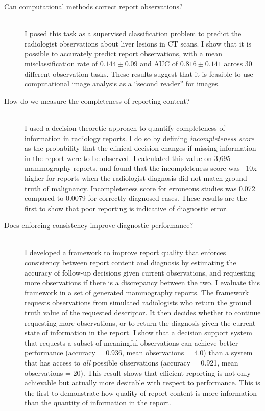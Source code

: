 \begin{description}
	\item[Can computational methods correct report observations?] \hfill \\
	I posed this task as a supervised classification problem to predict the radiologist observations about liver lesions in CT scans. I show that it is possible to accurately predict report observations, with a mean misclassification rate of $0.144\pm0.09$ and AUC of $0.816\pm0.141$ across 30 different observation tasks. These results suggest that it is feasible to use computational image analysis as a ``second reader'' for images.
	
	\item[How do we measure the completeness of reporting content?] \hfill \\
	I used a decision-theoretic approach to quantify completeness of information in radiology reports. I do so by defining \emph{incompleteness score} as the probability that the clinical decision changes if missing information in the report were to be observed. I calculated this value on 3,695 mammography reports, and found that the incompleteness score was ~10x higher for reports when the radiologist diagnosis did not match ground truth of malignancy. Incompleteness score for erroneous studies was 0.072 compared to 0.0079 for correctly diagnosed cases. These results are the first to show that poor reporting is indicative of diagnostic error.
	
	\item[Does enforcing consistency improve diagnostic performance?] \hfill \\
	 I developed a framework to improve report quality that enforces consistency between report content and diagnosis by estimating the accuracy of follow-up decisions given current observations, and requesting more observations if there is a discrepancy between the two. I evaluate this framework in a set of generated mammography reports. The framework requests observations from simulated radiologists who return the ground truth value of the requested descriptor. It then decides whether to continue requesting more observations, or to return the diagnosis given the current state of information in the report. I show that a decision support system that requests a subset of meaningful observations can achieve better performance (accuracy = 0.936, mean observations = 4.0) than a system that has access to \emph{all} possible observations (accuracy = 0.921, mean observations = 20). This result shows that efficient reporting is not only achievable but actually more desirable with respect to performance. This is the first to demonstrate how quality of report content is more information than the quantity of information in the report.
\end{description}

